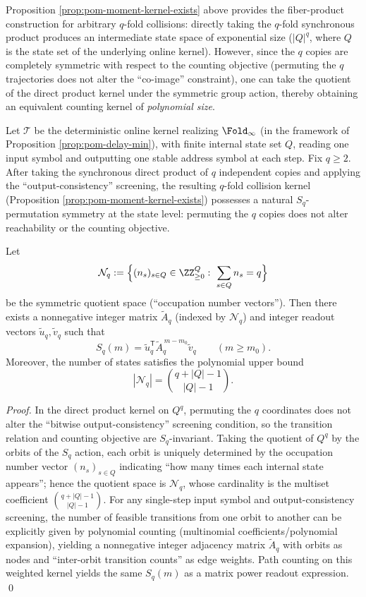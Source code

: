 Proposition \ref{prop:pom-moment-kernel-exists} above provides the fiber-product construction for arbitrary \(q\)-fold collisions: directly taking the \(q\)-fold synchronous product produces an intermediate state space of exponential size (\(|Q|^q\), where \(Q\) is the state set of the underlying online kernel).
However, since the \(q\) copies are completely symmetric with respect to the counting objective (permuting the \(q\) trajectories does not alter the ``co-image'' constraint), one can take the quotient of the direct product kernel under the symmetric group action, thereby obtaining an equivalent counting kernel of \emph{polynomial size}.

\begin{proposition}\label{prop:pom-moment-symmetric-power}
Let \(\mathcal{T}\) be the deterministic online kernel realizing \(\Fold_\infty\) (in the framework of Proposition \ref{prop:pom-delay-min}), with finite internal state set \(Q\), reading one input symbol and outputting one stable address symbol at each step.
Fix \(q\ge 2\). After taking the synchronous direct product of \(q\) independent copies and applying the ``output-consistency'' screening, the resulting \(q\)-fold collision kernel (Proposition \ref{prop:pom-moment-kernel-exists}) possesses a natural \(S_q\)-permutation symmetry at the state level: permuting the \(q\) copies does not alter reachability or the counting objective.

Let
$$
\mathcal{N}_{q}:=\Bigl\{(n_s)_{s\in Q}\in\ZZ_{\ge 0}^{Q}:\ \sum_{s\in Q}n_s=q\Bigr\}
$$
be the symmetric quotient space (``occupation number vectors''). Then there exists a nonnegative integer matrix \(\widetilde A_q\) (indexed by \(\mathcal{N}_q\)) and integer readout vectors \(\widetilde u_q,\widetilde v_q\) such that
$$
S_q(m)=\widetilde u_q^{\mathsf T}\widetilde A_q^{\,m-m_0}\widetilde v_q\qquad(m\ge m_0).
$$
Moreover, the number of states satisfies the polynomial upper bound
$$
|\mathcal{N}_q|=\binom{q+|Q|-1}{|Q|-1}.
$$
\end{proposition}

\begin{proof}
In the direct product kernel on \(Q^q\), permuting the \(q\) coordinates does not alter the ``bitwise output-consistency'' screening condition, so the transition relation and counting objective are \(S_q\)-invariant.
Taking the quotient of \(Q^q\) by the orbits of the \(S_q\) action, each orbit is uniquely determined by the occupation number vector \((n_s)_{s\in Q}\) indicating ``how many times each internal state appears''; hence the quotient space is \(\mathcal{N}_q\), whose cardinality is the multiset coefficient \(\binom{q+|Q|-1}{|Q|-1}\).
For any single-step input symbol and output-consistency screening, the number of feasible transitions from one orbit to another can be explicitly given by polynomial counting (multinomial coefficients/polynomial expansion), yielding a nonnegative integer adjacency matrix \(\widetilde A_q\) with orbits as nodes and ``inter-orbit transition counts'' as edge weights.
Path counting on this weighted kernel yields the same \(S_q(m)\) as a matrix power readout expression. \qed
\end{proof}

